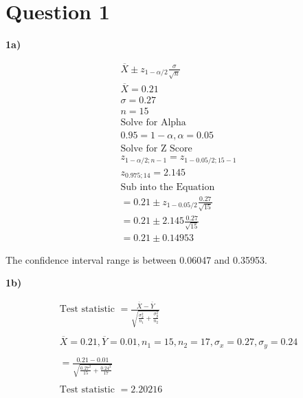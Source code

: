 \documentclass[oneside, a4paper]{article}
\begin{document}


\pagestyle{fancy}
\fancyhf{}

\newpage

\setcounter{secnumdepth}{-1}
\section{Question 1}

\textbf{1a)} 

\begin{equation*}
    \begin{split}
       \overline{X} \pm z_{1 - \alpha / 2} \frac{\sigma}{\sqrt{n}} \\ 
       \overline{X} = 0.21 \\
       \sigma = 0.27 \\
       n = 15 \\
       \text{Solve for Alpha} \\
       0.95 = 1 - \alpha, \alpha = 0.05 \\
       \text{Solve for Z Score} \\
       z_{1 - \alpha /2; n - 1} = z_{1 - 0.05 / 2; 15 - 1} \\
        z_{0.975; 14} = 2.145 \\
        \text{Sub into the Equation} \\
       = 0.21 \pm z_{1-0.05/2} \frac{0.27}{\sqrt{15}} \\ 
       = 0.21 \pm 2.145 \frac{0.27}{\sqrt{15}} \\
       = 0.21 \pm 0.14953
    \end{split}
\end{equation*}

The confidence interval range is between 0.06047 and 0.35953.

\textbf{1b)}

\begin{equation*}
    \begin{split}
        \text{Test statistic } = \frac{\overline{X} - \overline{Y}}{\sqrt{\frac{\sigma_x^2}{n_1} + \frac{\sigma_y^2}{n_2}}} \\\\
        \overline{X} = 0.21, \overline{Y} = 0.01, n_1 = 15, n_2 = 17, \sigma_x = 0.27, \sigma_y = 0.24 \\\\
        = \frac{0.21 - 0.01}{\sqrt{\frac{0.27^2}{15} + \frac{0.24^2}{17}}} \\\\
        \text{Test statistic } = 2.20216
    \end{split}
\end{equation*}
\end{document}
